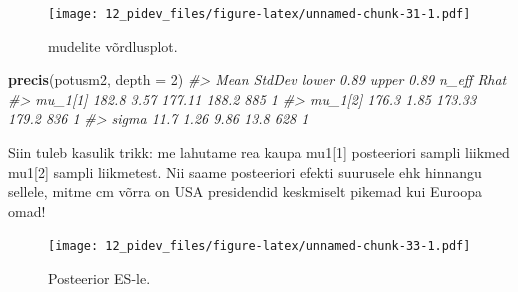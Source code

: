 \documentclass[]{book}
\newenvironment{Shaded}{\begin{snugshade}}{\end{snugshade}}
\newcommand{\KeywordTok}[1]{\textcolor[rgb]{0.13,0.29,0.53}{\textbf{#1}}}
\newcommand{\DataTypeTok}[1]{\textcolor[rgb]{0.13,0.29,0.53}{#1}}
\newcommand{\DecValTok}[1]{\textcolor[rgb]{0.00,0.00,0.81}{#1}}
\newcommand{\FloatTok}[1]{\textcolor[rgb]{0.00,0.00,0.81}{#1}}
\newcommand{\StringTok}[1]{\textcolor[rgb]{0.31,0.60,0.02}{#1}}
\newcommand{\CommentTok}[1]{\textcolor[rgb]{0.56,0.35,0.01}{\textit{#1}}}
\newcommand{\OperatorTok}[1]{\textcolor[rgb]{0.81,0.36,0.00}{\textbf{#1}}}
\newcommand{\NormalTok}[1]{#1}
\begin{document}
\begin{figure}
\centering
\texttt{[image: 12\_pidev\_files/figure-latex/unnamed-chunk-31-1.pdf]}
\caption{\label{fig:unnamed-chunk-31}mudelite võrdlusplot.}
\end{figure}

\begin{Shaded}
\begin{Highlighting}[]
\KeywordTok{precis}\NormalTok{(potusm2, }\DataTypeTok{depth =} \DecValTok{2}\NormalTok{)}
\CommentTok{#>          Mean StdDev lower 0.89 upper 0.89 n_eff Rhat}
\CommentTok{#> mu_1[1] 182.8   3.57     177.11      188.2   885    1}
\CommentTok{#> mu_1[2] 176.3   1.85     173.33      179.2   836    1}
\CommentTok{#> sigma    11.7   1.26       9.86       13.8   628    1}
\end{Highlighting}
\end{Shaded}

Siin tuleb kasulik trikk: me lahutame rea kaupa mu1{[}1{]} posteeriori
sampli liikmed mu1{[}2{]} sampli liikmetest. Nii saame posteeriori
efekti suurusele ehk hinnangu sellele, mitme cm võrra on USA presidendid
keskmiselt pikemad kui Euroopa omad!

\begin{Shaded}
\end{Shaded}

\begin{figure}
\centering
\texttt{[image: 12\_pidev\_files/figure-latex/unnamed-chunk-33-1.pdf]}
\caption{\label{fig:unnamed-chunk-33}Posteerior ES-le.}
\end{figure}

\begin{Shaded}
\end{Shaded}
\end{document}
